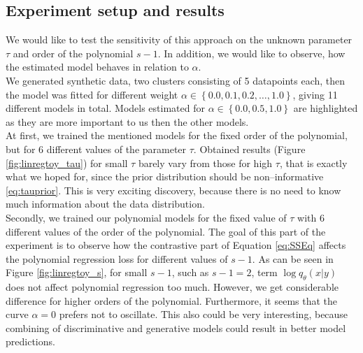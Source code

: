 \subsection{Experiment setup and results}
We would like to test the sensitivity of this approach on the unknown parameter $\tau$ and order of the polynomial $s-1$. In addition, we would like to observe, how the estimated model behaves in relation to $\alpha$. \\
We generated synthetic data, two clusters consisting of 5 datapoints each, then the model was fitted for different weight $\alpha \in \left\{0.0, 0.1, 0.2,\dots,1.0\right\}$, giving 11 different models in total. Models estimated for $\alpha \in \left\{0.0, 0.5, 1.0 \right\}$ are highlighted as they are more important to us then the other models.\\
At first, we trained the mentioned models for the fixed order of the polynomial, but for 6 different values of the parameter $\tau$. Obtained results (Figure \ref{fig:linregtoy_tau}) for small $\tau$ barely vary from those for high $\tau$, that is exactly what we hoped for, since the prior distribution should be non--informative \eqref{eq:tauprior}.  This is very exciting discovery, because there is no need to know much information about the data distribution.\\
Secondly, we trained our polynomial models for the fixed value of $\tau$ with 6 different values of the order of the polynomial. The goal of this part of the experiment is to observe how the contrastive part of Equation \eqref{eq:SSEq} affects the polynomial regression loss for different values of $s-1$. As can be seen in Figure \ref{fig:linregtoy_s}, for small $s-1$, such as $s-1 = 2$, term $\log q_{\theta}\left(x|y\right)$ does not affect polynomial regression too much. However, we get considerable difference for higher orders of the polynomial. Furthermore, it seems that the curve $\alpha = 0$ prefers not to oscillate. This also could be very interesting, because combining of discriminative and generative models could result in better model predictions.    

